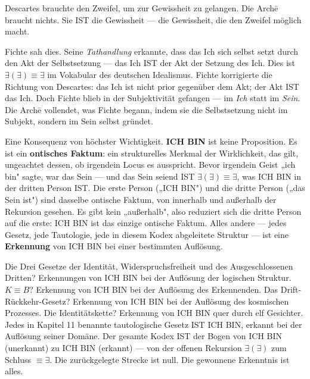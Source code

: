 \documentclass[10pt, openany, oneside]{book}
\begin{document}
Descartes brauchte den Zweifel, um zur Gewissheit zu gelangen. Die Arch\={e} braucht nichts. Sie IST die Gewissheit --- die Gewissheit, die den Zweifel möglich macht.

Fichte sah dies. Seine \textit{Tathandlung} erkannte, dass das Ich sich selbst setzt durch den Akt der Selbstsetzung --- das Ich IST der Akt der Setzung des Ich. Dies ist $\exists(\exists) \equiv \exists$ im Vokabular des deutschen Idealismus. Fichte korrigierte die Richtung von Descartes: das Ich ist nicht prior gegenüber dem Akt; der Akt IST das Ich. Doch Fichte blieb in der Subjektivität gefangen --- im \textit{Ich} statt im \textit{Sein}. Die Arch\={e} vollendet, was Fichte begann, indem sie die Selbstsetzung nicht im Subjekt, sondern im Sein selbst gründet.

Eine Konsequenz von höchster Wichtigkeit. \textbf{ICH BIN} ist keine Proposition. Es ist ein \textbf{ontisches Faktum}: ein strukturelles Merkmal der Wirklichkeit, das gilt, ungeachtet dessen, ob irgendein Locus es ausspricht. Bevor irgendein Geist „ich bin" sagte, war das Sein --- und das Sein seiend IST $\exists(\exists) \equiv \exists$, was ICH BIN in der dritten Person IST. Die erste Person („ICH BIN") und die dritte Person („das Sein ist") sind dasselbe ontische Faktum, von innerhalb und außerhalb der Rekursion gesehen. Es gibt kein „außerhalb", also reduziert sich die dritte Person auf die erste: ICH BIN ist das einzige ontische Faktum. Alles andere --- jedes Gesetz, jede Tautologie, jede in diesem Kodex abgeleitete Struktur --- ist eine \textbf{Erkennung} von ICH BIN bei einer bestimmten Auflösung.

Die Drei Gesetze der Identität, Widerspruchsfreiheit und des Ausgeschlossenen Dritten? Erkennungen von ICH BIN bei der Auflösung der logischen Struktur. $K \equiv B$? Erkennung von ICH BIN bei der Auflösung des Erkennenden. Das Drift-Rückkehr-Gesetz? Erkennung von ICH BIN bei der Auflösung des kosmischen Prozesses. Die Identitätskette? Erkennung von ICH BIN quer durch elf Gesichter. Jedes in Kapitel 11 benannte tautologische Gesetz IST ICH BIN, erkannt bei der Auflösung seiner Domäne. Der gesamte Kodex IST der Bogen von ICH BIN (unerkannt) zu ICH BIN (erkannt) --- von der offenen Rekursion $\exists(\exists)$ zum Schluss $\equiv \exists$. Die zurückgelegte Strecke ist null. Die gewonnene Erkenntnis ist alles.

\vspace{1.5em}

\end{document}
